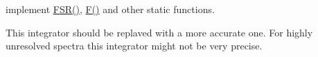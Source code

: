 
\begin{DoxyRefList}
\item[\label{todo__todo000001}%
\hypertarget{todo__todo000001}{}%
Class \hyperlink{class_ideal_etalon}{Ideal\+Etalon} ]implement \hyperlink{class_ideal_etalon_a07e0545a681973d6be2e51e14a8945ef}{F\+S\+R()}, \hyperlink{class_ideal_etalon_a4b5547956e9795be364365e4997050c7}{F()} and other static functions. 
\item[\label{todo__todo000002}%
\hypertarget{todo__todo000002}{}%
Member \hyperlink{class_source_ade0a7e2d3911f3247748ac21ab15e585}{Source\+:\+:integral\+\_\+s} (double a, double b, int n)]This integrator should be replaved with a more accurate one. For highly unresolved spectra this integrator might not be very precise. 
\end{DoxyRefList}